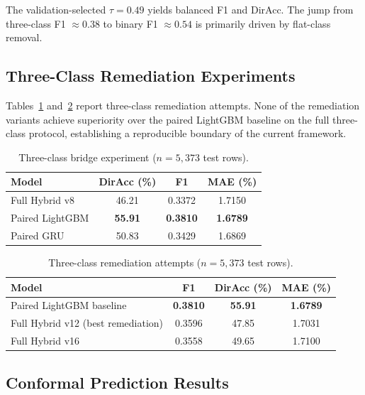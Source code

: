 \documentclass[runningheads]{llncs}
\begin{document}
The validation-selected $\tau=0.49$ yields balanced F1 and DirAcc. The jump from three-class F1 $\approx 0.38$ to binary F1 $\approx 0.54$ is primarily driven by flat-class removal.

\subsection{Three-Class Remediation Experiments}
\label{secv8-v16}

Tables~\ref{tabthree-class-bridge} and~\ref{tabthree-class-negative-sweep} report three-class remediation attempts. None of the remediation variants achieve superiority over the paired LightGBM baseline on the full three-class protocol, establishing a reproducible boundary of the current framework.

\begin{table}[htbp]
\centering
\caption{Three-class bridge experiment ($n=5,373$ test rows).}
\label{tabthree-class-bridge}
\begin{tabular}{lccc}
\toprule
Model & DirAcc (\%) & F1 & MAE (\%) \\
\midrule
Full Hybrid v8 & 46.21 & 0.3372 & 1.7150 \\
Paired LightGBM & \textbf{55.91} & \textbf{0.3810} & \textbf{1.6789} \\
Paired GRU & 50.83 & 0.3429 & 1.6869 \\
\bottomrule
\end{tabular}
\end{table}

\begin{table}[htbp]
\centering
\caption{Three-class remediation attempts ($n=5,373$ test rows).}
\label{tabthree-class-negative-sweep}
\begin{tabular}{lccc}
\toprule
Model & F1 & DirAcc (\%) & MAE (\%) \\
\midrule
Paired LightGBM baseline & \textbf{0.3810} & \textbf{55.91} & \textbf{1.6789} \\
Full Hybrid v12 (best remediation) & 0.3596 & 47.85 & 1.7031 \\
Full Hybrid v16 & 0.3558 & 49.65 & 1.7100 \\
\bottomrule
\end{tabular}
\end{table}

\subsection{Conformal Prediction Results}
\label{secexp4}
\end{document}
